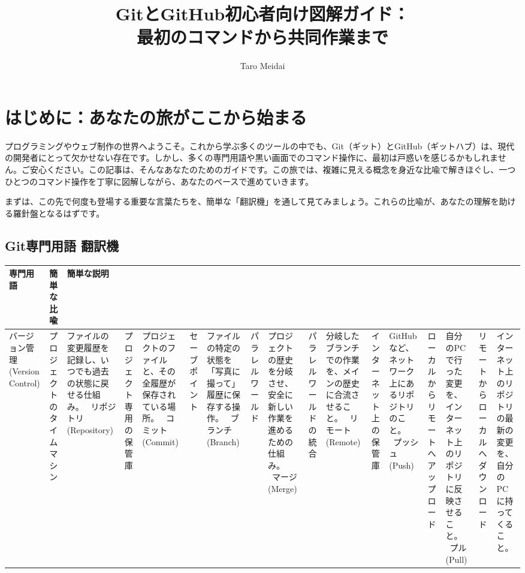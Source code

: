 \documentclass{ltjsarticle}
\begin{document}
\title{GitとGitHub初心者向け図解ガイド：\\
最初のコマンドから共同作業まで}
\author{Taro Meidai}
\maketitle
\tableofcontents
\newpage

\section*{はじめに：あなたの旅がここから始まる}
プログラミングやウェブ制作の世界へようこそ。これから学ぶ多くのツールの中でも、Git（ギット）とGitHub（ギットハブ）は、現代の開発者にとって欠かせない存在です。しかし、多くの専門用語や黒い画面でのコマンド操作に、最初は戸惑いを感じるかもしれません。ご安心ください。この記事は、そんなあなたのためのガイドです。この旅では、複雑に見える概念を身近な比喩で解きほぐし、一つひとつのコマンド操作を丁寧に図解しながら、あなたのペースで進めていきます。

まずは、この先で何度も登場する重要な言葉たちを、簡単な「翻訳機」を通して見てみましょう。これらの比喩が、あなたの理解を助ける羅針盤となるはずです。

\subsection*{Git専門用語 翻訳機}
\begin{tabularx}{\textwidth}{|l|l|X|}
\hline
\textbf{専門用語} & \textbf{簡単な比喩} & \textbf{簡単な説明} \\ 
\hline
バージョン管理 (Version Control) & プロジェクトのタイムマシン & ファイルの変更履歴を記録し、いつでも過去の状態に戻せる仕組み。 \ 
リポジトリ (Repository) & プロジェクト専用の保管庫 & プロジェクトのファイルと、その全履歴が保存されている場所。 \ 
コミット (Commit) & セーブポイント & ファイルの特定の状態を「写真に撮って」履歴に保存する操作。 \ 
ブランチ (Branch) & パラレルワールド & プロジェクトの歴史を分岐させ、安全に新しい作業を進めるための仕組み。 \ 
マージ (Merge) & パラレルワールドの統合 & 分岐したブランチでの作業を、メインの歴史に合流させること。 \ 
リモート (Remote) & インターネット上の保管庫 & GitHubなど、ネットワーク上にあるリポジトリのこと。 \ 
プッシュ (Push) & ローカルからリモートへアップロード & 自分のPCで行った変更を、インターネット上のリポジトリに反映させること。 \ 
プル (Pull) & リモートからローカルへダウンロード & インターネット上のリポジトリの最新の変更を、自分のPCに持ってくること。 \ 
\hline
\end{tabularx}
\end{document}
